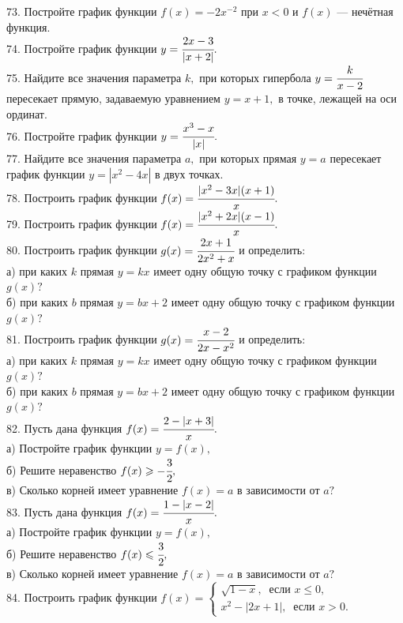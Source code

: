 \documentclass[12pt]{article}
\begin{document}
73. Постройте график функции $f(x)=-2x^{-2}$ при $x<0$ и $f(x)$ --- нечётная функция.\\
74. Постройте график функции $y=\cfrac{2x-3}{|x+2|}.$\\
75. Найдите все значения параметра $k,$ при которых гипербола $y=\cfrac{k}{x-2}$ пересекает прямую, задаваемую уравнением $y=x+1,$ в точке, лежащей на оси ординат.\\
76. Постройте график функции $y=\cfrac{x^3-x}{|x|}.$\\
77. Найдите все значения параметра $a,$ при которых прямая $y=a$ пересекает график функции $y=|x^2-4x|$ в двух точках.\\
78. Построить график функции $f(x)=\cfrac{|x^2-3x|(x+1)}{x}.$\\
79. Построить график функции $f(x)=\cfrac{|x^2+2x|(x-1)}{x}.$\\
80. Построить график функции $g(x)=\cfrac{2x+1}{2x^2+x}$ и определить:\\
а) при каких $k$ прямая $y=kx$ имеет одну общую точку с графиком функции $g(x)?$\\
б) при каких $b$ прямая $y=bx+2$ имеет одну общую точку с графиком функции $g(x)?$\\
81. Построить график функции $g(x)=\cfrac{x-2}{2x-x^2}$ и определить:\\
а) при каких $k$ прямая $y=kx$ имеет одну общую точку с графиком функции $g(x)?$\\
б) при каких $b$ прямая $y=bx+2$ имеет одну общую точку с графиком функции $g(x)?$\\
82. Пусть дана функция $f(x)=\cfrac{2-|x+3|}{x}.$\\
а) Постройте график функции $y=f(x),$\\
б) Решите неравенство $f(x)\geqslant-\cfrac{3}{2},$\\
в) Сколько корней имеет уравнение $f(x)=a$ в зависимости от $a?$\\
83. Пусть дана функция $f(x)=\cfrac{1-|x-2|}{x}.$\\
а) Постройте график функции $y=f(x),$\\
б) Решите неравенство $f(x)\leqslant\cfrac{3}{2},$\\
в) Сколько корней имеет уравнение $f(x)=a$ в зависимости от $a?$\\
84. Построить график функции $f(x)=\begin{cases} \sqrt{1-x},\ \text{ если } x\leqslant0,\\
x^2-|2x+1|,\ \text{ если } x>0.\end{cases}$\\
\end{document}
